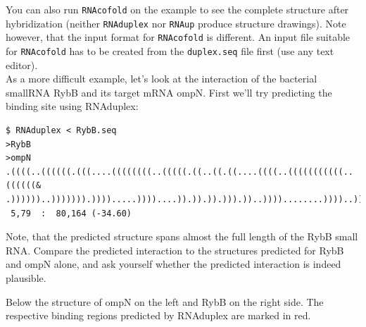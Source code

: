 \documentclass[a4paper]{article}
\begin{document}

You can also run \texttt{RNAcofold} on the example to see the complete
structure after hybridization (neither \texttt{RNAduplex} nor
\texttt{RNAup} produce structure drawings). Note however, that the input
format for \texttt{RNAcofold} is different. An input file suitable for
\texttt{RNAcofold} has to be created from the \texttt{duplex.seq} file first (use any text editor).\\
	

As a more difficult example, let's look at the interaction of the bacterial smallRNA RybB and its 
target mRNA ompN. First we'll try predicting the binding site using RNAduplex:
\begin{small}
\begin{verbatim}
$ RNAduplex < RybB.seq
>RybB
>ompN
.((((..((((((.(((....((((((((..(((((.((..((.((....((((..(((((((((((..((((((&
.))))))..))))))).)))).....))))....)).)).)).))).))..))))........))))..))).)))))).)))).  
 5,79  :  80,164 (-34.60)
\end{verbatim}%
\end{small}

Note, that the predicted structure spans almost the full length of the RybB small RNA.
Compare the predicted interaction to the structures predicted for RybB and ompN alone, and ask
yourself whether the predicted interaction is indeed plausible.

Below the structure of ompN on the left and RybB on the right side. The respective binding regions
predicted by RNAduplex are marked in red.
\end{document}
